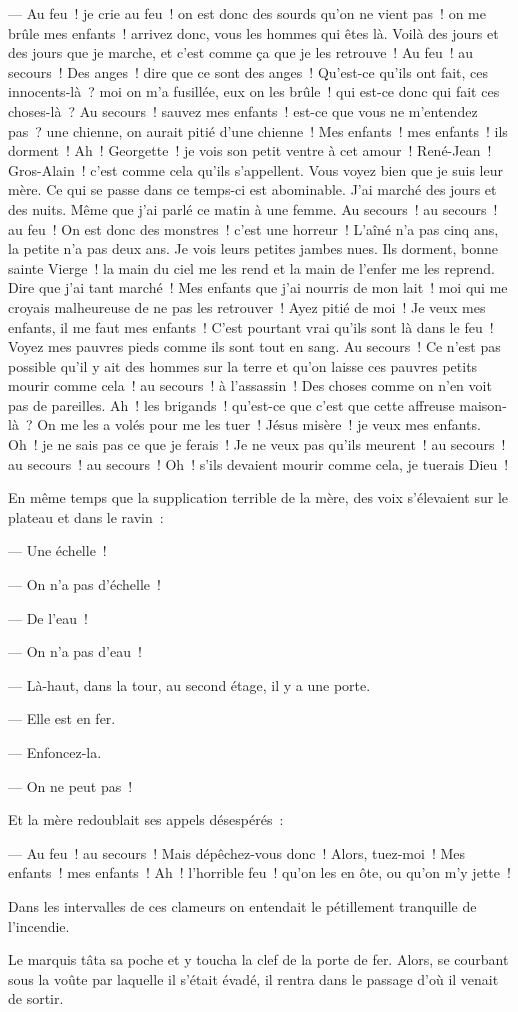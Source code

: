 \documentclass[french,twoside]{book} %
\begin{document}
— Au feu ! je crie au feu ! on est donc des sourds qu’on ne vient pas ! on me brûle mes enfants ! arrivez donc, vous les hommes qui êtes là. Voilà des jours et des jours que je marche, et c’est comme ça que je les retrouve ! Au feu ! au secours ! Des anges ! dire que ce sont des anges ! Qu’est-ce qu’ils ont fait, ces innocents-là ? moi on m’a fusillée, eux on les brûle ! qui est-ce donc qui fait ces choses-là ? Au secours ! sauvez mes enfants ! est-ce que vous ne m’entendez pas ? une chienne, on aurait pitié d’une chienne ! Mes enfants ! mes enfants ! ils dorment ! Ah ! Georgette ! je vois son petit ventre à cet amour ! René-Jean ! Gros-Alain ! c’est comme cela qu’ils s’appellent. Vous voyez bien que je suis leur mère. Ce qui se passe dans ce temps-ci est abominable. J’ai marché des jours et des nuits. Même que j’ai parlé ce matin à une femme. Au secours ! au secours ! au feu ! On est donc des monstres ! c’est une horreur ! L’aîné n’a pas cinq ans, la petite n’a pas deux ans. Je vois leurs petites jambes nues. Ils dorment, bonne sainte Vierge ! la main du ciel me les rend et la main de l’enfer me les reprend. Dire que j’ai tant marché ! Mes enfants que j’ai nourris de mon lait ! moi qui me croyais malheureuse de ne pas les retrouver ! Ayez pitié de moi !  Je veux mes enfants, il me faut mes enfants ! C’est pourtant vrai qu’ils sont là dans le feu ! Voyez mes pauvres pieds comme ils sont tout en sang. Au secours ! Ce n’est pas possible qu’il y ait des hommes sur la terre et qu’on laisse ces pauvres petits mourir comme cela ! au secours ! à l’assassin ! Des choses comme on n’en voit pas de pareilles. Ah ! les brigands ! qu’est-ce que c’est que cette affreuse maison-là ? On me les a volés pour me les tuer ! Jésus misère ! je veux mes enfants. Oh ! je ne sais pas ce que je ferais ! Je ne veux pas qu’ils meurent ! au secours ! au secours ! au secours ! Oh ! s’ils devaient mourir comme cela, je tuerais Dieu !\par
En même temps que la supplication terrible de la mère, des voix s’élevaient sur le plateau et dans le ravin :\par
— Une échelle !\par
— On n’a pas d’échelle !\par
— De l’eau !\par
— On n’a pas d’eau !\par
— Là-haut, dans la tour, au second étage, il y a une porte.\par
— Elle est en fer.\par
— Enfoncez-la.\par
— On ne peut pas !\par
Et la mère redoublait ses appels désespérés :\par
— Au feu ! au secours ! Mais dépêchez-vous donc ! Alors, tuez-moi ! Mes enfants ! mes enfants ! Ah ! l’horrible feu ! qu’on les en ôte, ou qu’on m’y jette !\par
Dans les intervalles de ces clameurs on entendait le pétillement tranquille de l’incendie.\par
 Le marquis tâta sa poche et y toucha la clef de la porte de fer. Alors, se courbant sous la voûte par laquelle il s’était évadé, il rentra dans le passage d’où il venait de sortir.
\end{document}
